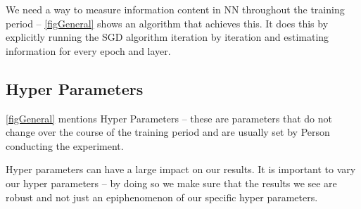 \documentclass[dissertation.tex]{subfiles}
\begin{document}
We need a way to measure information content in NN throughout the training
period -- \autoref{figGeneral} shows an algorithm that achieves this. It does
this by explicitly running the SGD algorithm iteration by iteration and
estimating information for every epoch and layer.

\subsection{Hyper Parameters}
\label{subHyperParameters}

\autoref{figGeneral} mentions Hyper Parameters -- these are parameters that do
not change over the course of the training period and are usually set by Person
conducting the experiment.  

Hyper parameters can have a large impact on our results. It is important to vary
our hyper parameters -- by doing so we make sure that the results we see are
robust and not just an epiphenomenon of our specific hyper parameters.
\end{document}
